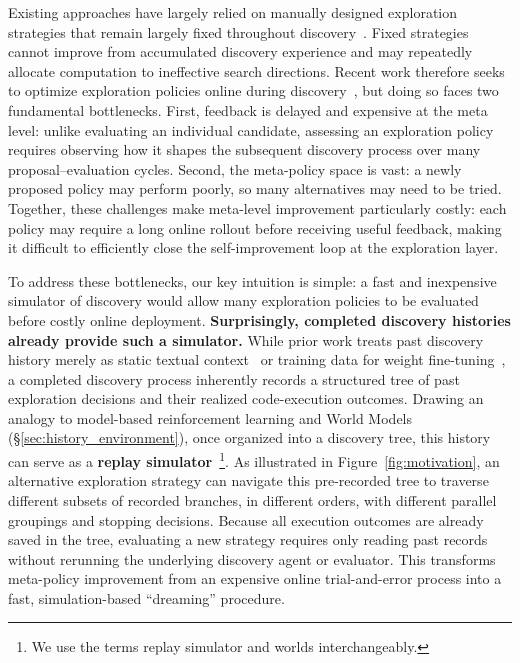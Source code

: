 Existing approaches have largely relied on manually designed exploration strategies that remain largely fixed throughout discovery~\citep{novikov2025alphaevolve,yan2026pacevolve,du2026mlevolve,jiang2026deltaevolve,ye2026evaluation}. Fixed strategies cannot improve from accumulated discovery experience and may repeatedly allocate computation to ineffective search directions.  Recent work therefore seeks to optimize exploration policies online during discovery~\citep{liu2026evox}, but doing so faces two fundamental bottlenecks. First, feedback is delayed and expensive at the meta level: unlike evaluating an individual candidate, assessing an exploration policy requires observing how it shapes the subsequent discovery process over many proposal--evaluation cycles. Second, the meta-policy space is vast: a newly proposed policy may perform poorly, so many alternatives may need to be tried. Together, these challenges make meta-level improvement particularly costly: each policy may require a long online rollout before receiving useful feedback, making it difficult to efficiently close the self-improvement loop at the exploration layer. 

To address these bottlenecks, our key intuition is simple: a fast and inexpensive simulator of discovery would allow many exploration policies to be evaluated before costly online deployment. \textbf{Surprisingly, completed discovery histories already provide such a simulator.} While prior work treats past discovery history merely as static textual context~\citep{hu2025memory,ouyang2026reasoningbank} or training data for weight fine-tuning~\citep{yuksekgonul2026learning,wang2025thetaevolve}, a completed discovery process inherently records a structured tree of past exploration decisions and their realized code-execution outcomes. Drawing an analogy to model-based reinforcement learning and World Models~\citep{ha2018world,hafner2023mastering} (\S\ref{sec:history_environment}), once organized into a discovery tree, this history can serve as a \textbf{replay simulator}~\footnote{We use the terms replay simulator and worlds interchangeably.}. As illustrated in Figure~\ref{fig:motivation}, an alternative exploration strategy can navigate this pre-recorded tree to traverse different subsets of recorded branches, in different orders, with different parallel groupings and stopping decisions. Because all execution outcomes are already saved in the tree, evaluating a new strategy requires only reading past records without rerunning the underlying discovery agent or evaluator. This transforms meta-policy improvement from an expensive online trial-and-error process into a fast, simulation-based ``dreaming'' procedure.

